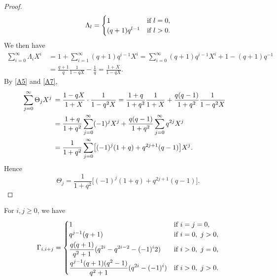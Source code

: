 \documentclass{amsart}
\numberwithin{equation}{section}
\theoremstyle{definition}
\begin{document}
\begin{proof}
\[
\Lambda_l=\begin{cases}
1&\text{if}\ l=0,\cr
(q+1)q^{l-1}&\text{if}\ l>0.
\end{cases}
\]
We then have
\begin{align}\tag{A\theaeqno}\label{A7}
\sum_{i=0}^\infty\Lambda_iX^i\,&=1+\sum_{i=1}^\infty(q+1)q^{i-1}X^i=\sum_{i=0}^\infty(q+1)q^{i-1}X^i+1-(q+1)q^{-1}\\
&=\frac{q+1}q\frac 1{1-qX}-\frac 1q=\frac{1+X}{1-qX}.\nonumber
\end{align}
By \eqref{A5} and \eqref{A7}, 
\begin{align*}
\sum_{j=0}^\infty\Theta_jX^j\,&=\frac{1-qX}{1+X}\cdot\frac 1{1-q^2X}=\frac{1+q}{1+q^2}\frac 1{1+X}+\frac{q(q-1)}{1+q^2}\frac 1{1-q^2X}\cr
&=\frac{1+q}{1+q^2}\sum_{j=0}^\infty(-1)^jX^j+\frac{q(q-1)}{1+q^2}\sum_{j=0}^\infty q^{2j}X^j\cr
&=\frac 1{1+q^2}\sum_{j=0}^\infty\bigl[(-1)^j(1+q)+q^{2j+1}(q-1)\bigr]X^j.
\end{align*}
Hence
\[
\Theta_j=\frac 1{1+q^2}\bigl[(-1)^j(1+q)+q^{2j+1}(q-1)\bigr].
\]
\end{proof}

\begin{Alem}\label{LA5}
For $i,j\ge 0$, we have
\[
\Gamma_{i,i+j}=\begin{cases}
1&\text{if}\ i=j=0,\cr
q^{j-1}(q+1)&\text{if}\ i=0,\ j>0,\vspace{0.3em}\cr
\displaystyle\frac{q(q+1)}{q^2+1}(q^{2i}-q^{2i-2}-(-1)^i2)&\text{if}\ i>0,\ j=0,\vspace{0.3em}\cr
\displaystyle\frac{q^{j-1}(q+1)(q^2-1)}{q^2+1}(q^{2i}-(-1)^i)&\text{if}\ i>0,\ j>0.
\end{cases}
\]
\end{Alem}
\end{document}

